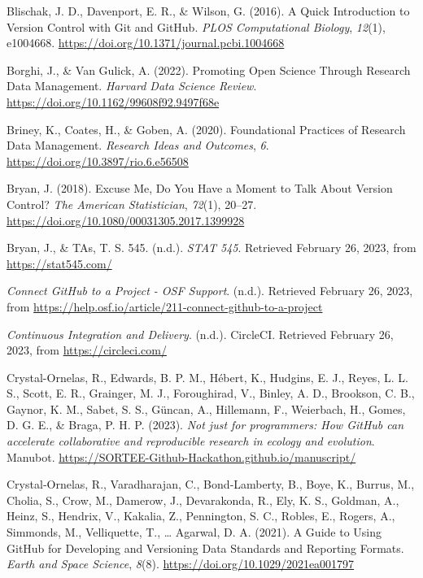 \begin{CSLReferences}{1}{0}
\leavevmode{}%
Blischak, J. D., Davenport, E. R., \& Wilson, G. (2016). A Quick Introduction to Version Control with Git and GitHub. \emph{PLOS Computational Biology}, \emph{12}(1), e1004668. \url{https://doi.org/10.1371/journal.pcbi.1004668}

\leavevmode{}%
Borghi, J., \& Van Gulick, A. (2022). Promoting Open Science Through Research Data Management. \emph{Harvard Data Science Review}. \url{https://doi.org/10.1162/99608f92.9497f68e}

\leavevmode{}%
Briney, K., Coates, H., \& Goben, A. (2020). Foundational Practices of Research Data Management. \emph{Research Ideas and Outcomes}, \emph{6}. \url{https://doi.org/10.3897/rio.6.e56508}

\leavevmode{}%
Bryan, J. (2018). Excuse Me, Do You Have a Moment to Talk About Version Control? \emph{The American Statistician}, \emph{72}(1), 20--27. \url{https://doi.org/10.1080/00031305.2017.1399928}

\leavevmode{}%
Bryan, J., \& TAs, T. S. 545. (n.d.). \emph{STAT 545}. Retrieved February 26, 2023, from \url{https://stat545.com/}

\leavevmode{}%
\emph{Connect GitHub to a Project - OSF Support}. (n.d.). Retrieved February 26, 2023, from \url{https://help.osf.io/article/211-connect-github-to-a-project}

\leavevmode{}%
\emph{Continuous Integration and Delivery}. (n.d.). CircleCI. Retrieved February 26, 2023, from \url{https://circleci.com/}

\leavevmode{}%
Crystal-Ornelas, R., Edwards, B. P. M., Hébert, K., Hudgins, E. J., Reyes, L. L. S., Scott, E. R., Grainger, M. J., Foroughirad, V., Binley, A. D., Brookson, C. B., Gaynor, K. M., Sabet, S. S., Güncan, A., Hillemann, F., Weierbach, H., Gomes, D. G. E., \& Braga, P. H. P. (2023). \emph{Not just for programmers: How GitHub can accelerate collaborative and reproducible research in ecology and evolution}. Manubot. \url{https://SORTEE-Github-Hackathon.github.io/manuscript/}

\leavevmode{}%
Crystal‐Ornelas, R., Varadharajan, C., Bond‐Lamberty, B., Boye, K., Burrus, M., Cholia, S., Crow, M., Damerow, J., Devarakonda, R., Ely, K. S., Goldman, A., Heinz, S., Hendrix, V., Kakalia, Z., Pennington, S. C., Robles, E., Rogers, A., Simmonds, M., Velliquette, T., \ldots{} Agarwal, D. A. (2021). A Guide to Using GitHub for Developing and Versioning Data Standards and Reporting Formats. \emph{Earth and Space Science}, \emph{8}(8). \url{https://doi.org/10.1029/2021ea001797}


\end{CSLReferences}
